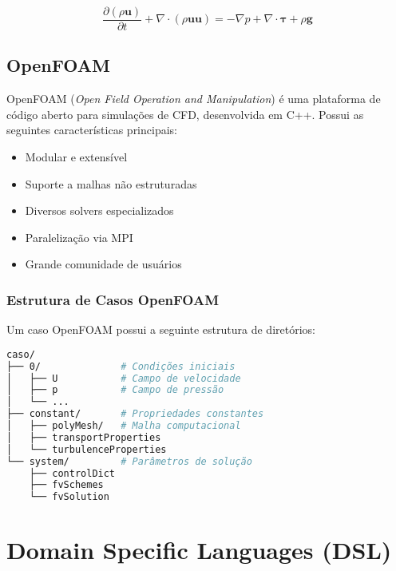 \begin{equation}
\frac{\partial (\rho \mathbf{u})}{\partial t} + \nabla \cdot (\rho \mathbf{u} \mathbf{u}) = -\nabla p + \nabla \cdot \boldsymbol{\tau} + \rho \mathbf{g}
\label{eq:navier-stokes}
\end{equation}

\subsection{OpenFOAM}

OpenFOAM (\textit{Open Field Operation and Manipulation}) é uma plataforma de código aberto para simulações de CFD, desenvolvida em C++. Possui as seguintes características principais:

\begin{itemize}
    \item Modular e extensível
    \item Suporte a malhas não estruturadas
    \item Diversos solvers especializados
    \item Paralelização via MPI
    \item Grande comunidade de usuários
\end{itemize}

\subsubsection{Estrutura de Casos OpenFOAM}

Um caso OpenFOAM possui a seguinte estrutura de diretórios:

\begin{lstlisting}[language=bash, caption={Estrutura de diretórios OpenFOAM}]
caso/
├── 0/              # Condições iniciais
│   ├── U           # Campo de velocidade
│   ├── p           # Campo de pressão
│   └── ...
├── constant/       # Propriedades constantes
│   ├── polyMesh/   # Malha computacional
│   ├── transportProperties
│   └── turbulenceProperties
└── system/         # Parâmetros de solução
    ├── controlDict
    ├── fvSchemes
    └── fvSolution
\end{lstlisting}

\section{Domain Specific Languages (DSL)}

